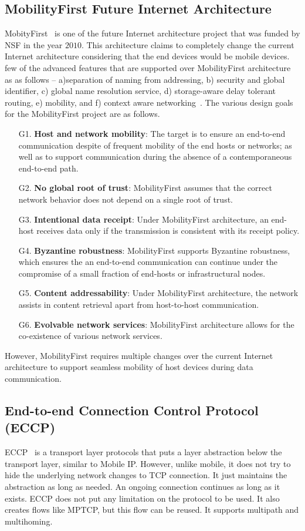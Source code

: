 \subsection{MobilityFirst Future Internet Architecture}
MobityFirst~\cite{seskar2011mobilityfirst,raychaudhuri2012mobilityfirst,venkataramani2014mobilityfirst} is one of the future Internet architecture project that was funded by NSF in the year $2010$. This architecture claims to completely change the current Internet architecture considering that the end devices would be mobile devices.  few of the advanced features that are supported over MobilityFirst architecture as as follows -- a)separation of naming from addressing, b) security and global identifier, c) global name resolution service, d) storage-aware delay tolerant routing, e) mobility, and f) context aware networking~\cite{MobilityFirstContextAwareDemo}. The various design goals for the MobilityFirst project are as follows.
\begin{enumerate}
	\item[G1.] \textbf{Host and network mobility}: The target is to ensure an end-to-end communication despite of frequent mobility of the end hosts or networks; as well as to support communication during the absence of a contemporaneous end-to-end path.
	\item[G2.] \textbf{No global root of trust}: MobilityFirst assumes that the correct network behavior does not depend on a single root of trust. 
	\item[G3.] \textbf{Intentional data receipt}: Under MobilityFirst architecture, an end-host receives data only if the transmission is consistent with its receipt policy.
	\item[G4.] \textbf{Byzantine robustness}: MobilityFirst supports Byzantine robustness, which ensures the an end-to-end communication can continue under the compromise of a small fraction of end-hosts or infrastructural nodes.
	\item[G5.] \textbf{Content addressability}: Under MobilityFirst architecture, the network assists in content retrieval apart from host-to-host communication.
	\item[G6.] \textbf{Evolvable network services}: MobilityFirst architecture allows for the co-existence of various network services.
\end{enumerate}
However, MobilityFirst requires multiple changes over the current Internet architecture to support seamless mobility of host devices during data communication. 

\subsection{End-to-end Connection Control Protocol (ECCP)}
ECCP~\cite{ECCP} is a transport layer protocols that puts a layer abstraction below the transport layer, similar to Mobile IP. However, unlike mobile, it does not try to hide the underlying network changes to TCP connection. It just maintains the abstraction as long as needed. An ongoing connection continues as long as it exists. ECCP does not put any limitation on the protocol to be used. It also creates flows like MPTCP, but this flow can be reused. It supports multipath and multihoming. 

